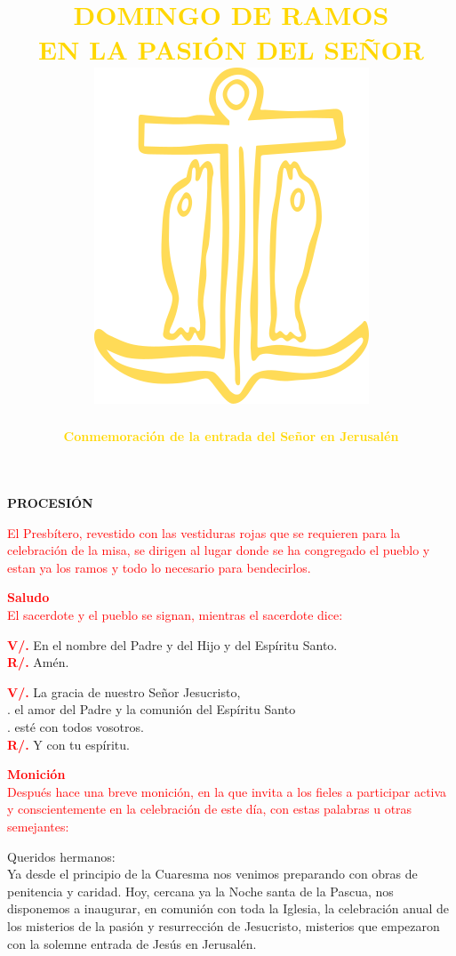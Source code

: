 \documentclass[12pt, letterpaper]{report}
\title{
	\Huge {\bfseries \textcolor{gold}{DOMINGO DE RAMOS\\ EN LA PASIÓN DEL SEÑOR}} \\
	\vspace{2em}
	\includegraphics{ancla}
}
\author{
	\large {\bfseries \textcolor{gold}{Conmemoración de la entrada del Señor en Jerusalén}}
}
\date{ }
\begin{document}
	\pagecolor{red}\afterpage{\nopagecolor}
	\maketitle

	\begin{center}
	\Huge {\bfseries PROCESIÓN}
	\end{center}

	\large {\textcolor{red}{El Presbítero, revestido con las vestiduras rojas que se requieren para la celebración de la misa, se dirigen al lugar donde se ha congregado el pueblo y estan ya los ramos y todo lo necesario para bendecirlos.}}

	\Large {\bfseries \textcolor{red}{Saludo}}\\
	\large {\textcolor{red}{El sacerdote y el pueblo se signan, mientras el sacerdote dice:}}

	\noindent
	\Large {\bfseries \textcolor{red}{V/.}} \hspace{0.5cm} {En el nombre del Padre y del Hijo \Huge{\textcolor{red}{}} \Large y del Espíritu Santo.}\\
	\Large{{\bfseries \textcolor{red}{R/.}} \hspace{0.5cm} Amén.}

	\noindent
	\Large {{\bfseries \textcolor{red}{V/.}} \hspace{0.5cm} La gracia de nuestro Señor Jesucristo,\\
	. \hspace{1.5cm} el amor del Padre y la comunión del Espíritu Santo\\
	. \hspace{1.5cm} esté con todos vosotros.}\\
	\Large{{\bfseries \textcolor{red}{R/.}} \hspace{0.5cm} Y con tu espíritu.}

	\Large {\bfseries \textcolor{red}{Monición}}\\
	\large {\textcolor{red}{Después hace una breve monición, en la que invita a los fieles a participar activa y conscientemente en la celebración de este día, con estas palabras u otras semejantes:}}

	\Large {Queridos hermanos:\\
	Ya desde el principio de la Cuaresma nos venimos preparando con obras de penitencia y caridad. Hoy, cercana ya la Noche santa de la Pascua, nos disponemos a inaugurar, en comunión con toda la Iglesia, la celebración anual de los misterios de la pasión y resurrección de Jesucristo, misterios que empezaron con la solemne entrada de Jesús en Jerusalén.}
\end{document}
